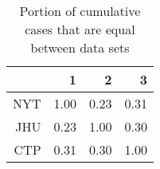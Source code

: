 \begin{table}[ht]
\centering
\begin{tabular}{rrrr}
  \hline
 & 1 & 2 & 3 \\ 
  \hline
NYT & 1.00 & 0.23 & 0.31 \\ 
  JHU & 0.23 & 1.00 & 0.30 \\ 
  CTP & 0.31 & 0.30 & 1.00 \\ 
   \hline
\end{tabular}
\caption{Portion of cumulative cases that are equal between data sets\label{tab:casediff}} 
\end{table}
